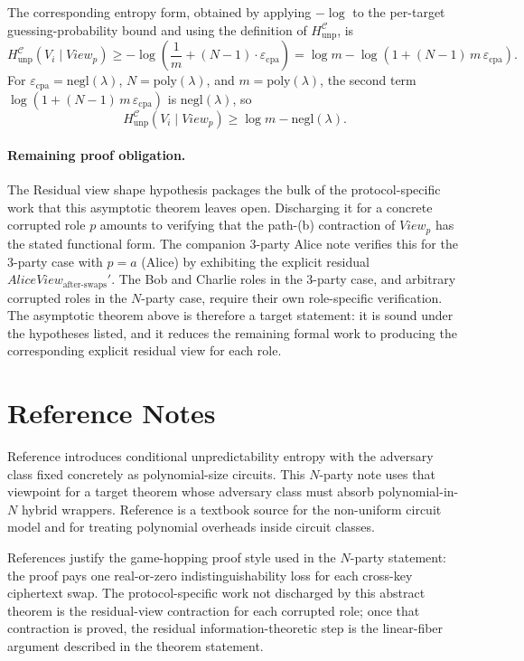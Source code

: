 \documentclass[11pt]{article}
\newcommand{\epscpa}{\varepsilon_{\mathrm{cpa}}}
\newcommand{\HunpC}{H_{\mathrm{unp}}^{\mathcal{C}}}
\newcommand{\AliceViewHyb}{\mathit{AliceView}_{\textrm{after-swaps}}'}
\begin{document}
The corresponding entropy form, obtained by applying $-\log$ to the per-target guessing-probability bound and using the definition of $\HunpC$, is
\[
\HunpC(V_i \mid \mathit{View}_p)
\geq -\log\left( \frac{1}{m} + (N-1) \cdot \epscpa \right)
= \log m - \log\left(1 + (N-1) \, m \, \epscpa\right).
\]
For $\epscpa = \mathrm{negl}(\lambda)$, $N = \mathrm{poly}(\lambda)$, and $m = \mathrm{poly}(\lambda)$, the second term $\log(1 + (N-1) \, m \, \epscpa)$ is $\mathrm{negl}(\lambda)$, so
\[
\HunpC(V_i \mid \mathit{View}_p) \geq \log m - \mathrm{negl}(\lambda).
\]

\paragraph{Remaining proof obligation.} The Residual view shape hypothesis packages the bulk of the protocol-specific work that this asymptotic theorem leaves open. Discharging it for a concrete corrupted role $p$ amounts to verifying that the path-(b) contraction of $\mathit{View}_p$ has the stated functional form. The companion 3-party Alice note verifies this for the 3-party case with $p = a$ (Alice) by exhibiting the explicit residual $\AliceViewHyb$. The Bob and Charlie roles in the 3-party case, and arbitrary corrupted roles in the $N$-party case, require their own role-specific verification. The asymptotic theorem above is therefore a target statement: it is sound under the hypotheses listed, and it reduces the remaining formal work to producing the corresponding explicit residual view for each role.

\section*{Reference Notes}

Reference \cite[Definition~7]{hsiao-lu-reyzin} introduces conditional unpredictability entropy with the adversary class fixed concretely as polynomial-size circuits. This $N$-party note uses that viewpoint for a target theorem whose adversary class must absorb polynomial-in-$N$ hybrid wrappers. Reference \cite[Secs.~1.3.3 and 3.2.4]{goldreich-foc} is a textbook source for the non-uniform circuit model and for treating polynomial overheads inside circuit classes.

References \cite{bellare-concrete,shoup-games,blanchet-pointcheval-games} justify the game-hopping proof style used in the $N$-party statement: the proof pays one real-or-zero indistinguishability loss for each cross-key ciphertext swap. The protocol-specific work not discharged by this abstract theorem is the residual-view contraction for each corrupted role; once that contraction is proved, the residual information-theoretic step is the linear-fiber argument described in the theorem statement.
\end{document}
